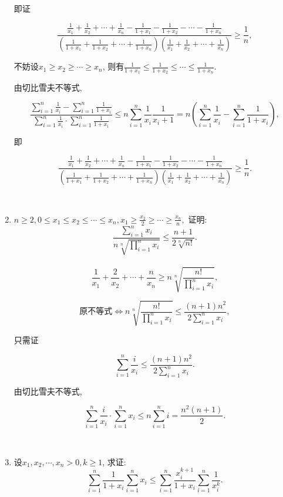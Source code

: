 \documentclass[8pt]{article}
\begin{document}
\begin{enumerate}
			即证

			$$\frac{\frac{1}{x_1}+\frac{1}{x_2}+\cdots+\frac{1}{x_n} - \frac{1}{1+x_1}-\frac{1}{1+x_2}-\cdots-\frac{1}{1+x_n}}{\left(\frac{1}{1+x_1}+\frac{1}{1+x_2}+\cdots+\frac{1}{1+x_n}\right)\left(\frac{1}{x_1}+\frac{1}{x_2}+\cdots+\frac{1}{x_n}\right)} \geq \frac{1}{n},$$

			不妨设$x_1 \geq x_2 \geq \cdots \geq x_n$, 则有$\displaystyle \frac{1}{1+x_1} \leq \frac{1}{1+x_2} \leq \cdots \leq \frac{1}{1+x_n}.$

			由切比雪夫不等式,

			$$\frac{\sum_{i=1}^{n} \frac{1}{x_i} - \sum_{i=1}^{n}\frac{1}{1+x_i}}{\sum_{i=1}^{n} \frac{1}{x_i} \cdot \sum_{i=1}^{n}\frac{1}{1+x_i}} \leq n\sum_{i=1}^{n} \frac{1}{x_i} \frac{1}{x_i + 1} = n\left(\sum_{i=1}^{n}\frac{1}{x_i} - \sum_{i=1}^{n}\frac{1}{1+x_i}\right),$$

			即

			$$\frac{\frac{1}{x_1}+\frac{1}{x_2}+\cdots+\frac{1}{x_n} - \frac{1}{1+x_1}-\frac{1}{1+x_2}-\cdots-\frac{1}{1+x_n}}{\left(\frac{1}{1+x_1}+\frac{1}{1+x_2}+\cdots+\frac{1}{1+x_n}\right)\left(\frac{1}{x_1}+\frac{1}{x_2}+\cdots+\frac{1}{x_n}\right)} \geq \frac{1}{n}.$$

		~\\

		\item $n\geq 2, 0 \leq x_1 \leq x_2 \leq \cdots \leq x_n, \displaystyle x_1 \geq \frac{x_2}{2} \geq \cdots \geq \frac{x_n}{n},$ 证明: $$\frac{\sum\limits_{i=1}^{n} x_i}{n\sqrt[n]{\prod\limits_{i=1}^{n}x_i}}\leq\frac{n+1}{2\sqrt[n]{n!}}.$$
			~\\

			$$\frac{1}{x_1}+\frac{2}{x_2}+\cdots+\frac{n}{x_n} \geq n\sqrt[n]{\frac{n!}{\prod\limits_{i=1}^{n} x_i}},$$

			$$\text{原不等式}\Leftrightarrow n\sqrt[n]{\frac{n!}{\prod\limits_{i=1}^{n} x_i}} \leq \frac{(n+1)n^2}{2\sum\limits_{i=1}^{n} x_i},$$

			只需证

			$$\sum_{i=1}^{n} \frac{i}{x_i} \leq \frac{(n+1)n^2}{2\sum\limits_{i=1}^{n} x_i}.$$

			由切比雪夫不等式,

			$$\sum_{i=1}^{n} \frac{i}{x_i} \cdot \sum_{i=1}^{n} x_i \leq n\sum_{i=1}^{n} i = \frac{n^2(n+1)}{2}.$$

		~\\

		\item 设$x_1, x_2, \cdots, x_n > 0, k\geq 1$, 求证: $$\sum_{i=1}^{n} \frac{1}{1+x_i} \sum_{i=1}^{n} x_i \leq \sum_{i=1}^{n} \frac{x_i^{k+1}}{1+x_i} \sum_{i=1}^{n} \frac{1}{x_i^k}.$$
			~\\


\end{enumerate}
\end{document}
